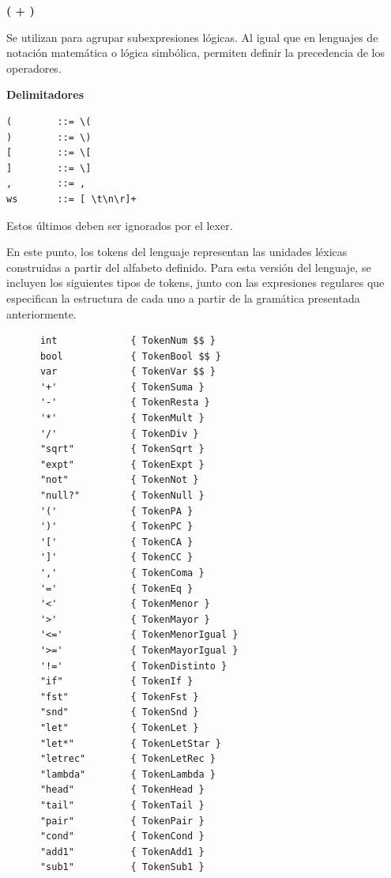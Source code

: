 \documentclass[a4paper,12pt]{article}
\begin{document}
\begin{tcolorbox}[title=Correción: 
Sintaxis léxica de LAMBDAE, breakable]
            \textbf{( + )}

Se utilizan para agrupar subexpresiones lógicas. Al igual que en lenguajes de
notación matemática o lógica simbólica, permiten definir la precedencia de los
operadores.

\textbf{Delimitadores}
\begin{verbatim}
(        ::= \(
)        ::= \)
[        ::= \[
]        ::= \]
,        ::= ,
ws       ::= [ \t\n\r]+
\end{verbatim}


Estos últimos deben ser ignorados por el lexer.


\end{tcolorbox}

En este punto, los tokens del lenguaje representan las unidades léxicas construidas a partir del alfabeto definido. Para esta versión del lenguaje, se incluyen los siguientes tipos de tokens, junto con las expresiones regulares que especifican la estructura de cada uno a partir de la gramática presentada anteriormente.

\begin{tcolorbox}[title=Tokens en LAMBDAE, breakable]
 
\begin{center}
\begin{verbatim}
      int             { TokenNum $$ }     
      bool            { TokenBool $$ }
      var             { TokenVar $$ }
      '+'             { TokenSuma }
      '-'             { TokenResta }
      '*'             { TokenMult }
      '/'             { TokenDiv }
      "sqrt"          { TokenSqrt }
      "expt"          { TokenExpt }
      "not"           { TokenNot }
      "null?"         { TokenNull }
      '('             { TokenPA }
      ')'             { TokenPC }
      '['             { TokenCA }
      ']'             { TokenCC }
      ','             { TokenComa }
      '='             { TokenEq }
      '<'             { TokenMenor }      
      '>'             { TokenMayor }  
      '<='            { TokenMenorIgual }
      '>='            { TokenMayorIgual }
      '!='            { TokenDistinto }
      "if"            { TokenIf }
      "fst"           { TokenFst }
      "snd"           { TokenSnd }
      "let"           { TokenLet }
      "let*"          { TokenLetStar }
      "letrec"        { TokenLetRec }
      "lambda"        { TokenLambda }
      "head"          { TokenHead }
      "tail"          { TokenTail }
      "pair"          { TokenPair }
      "cond"          { TokenCond }
      "add1"          { TokenAdd1 }
      "sub1"          { TokenSub1 }

\end{verbatim}
\end{center}

\end{tcolorbox}
\end{document}

